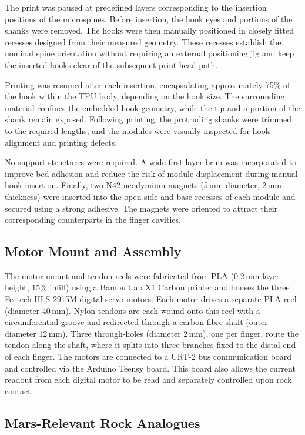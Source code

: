 \documentclass[letterpaper, 10 pt, conference, twoside]{ieeetran}
\begin{document}
The print was paused at predefined layers corresponding to the insertion positions of the microspines. Before insertion, the hook eyes and portions of the shanks were removed. The hooks were then manually positioned in closely fitted recesses designed from their measured geometry. These recesses establish the nominal spine orientation without requiring an external positioning jig and keep the inserted hooks clear of the subsequent print-head path.

Printing was resumed after each insertion, encapsulating approximately 75\% of the hook within the TPU body, depending on the hook size. The surrounding material confines the embedded hook geometry, while the tip and a portion of the shank remain exposed. Following printing, the protruding shanks were trimmed to the required lengths, and the modules were visually inspected for hook alignment and printing defects.

No support structures were required. A wide first-layer brim was incorporated to improve bed adhesion and reduce the risk of module displacement during manual hook insertion. Finally, two N42 neodymium magnets (5\,mm diameter, 2\,mm thickness) were inserted into the open side and base recesses of each module and secured using a strong adhesive. The magnets were oriented to attract their corresponding counterparts in the finger cavities.


\subsection{Motor Mount and Assembly}

The motor mount and tendon reels were fabricated
from PLA (0.2\,mm layer height, 15\% infill) using a Bambu Lab X1 Carbon printer and houses the three Feetech HLS 2915M digital servo motors. Each motor drives a separate PLA reel (diameter 40\,mm). Nylon tendons are each wound onto this reel with a circumferential groove and redirected through a carbon fibre shaft (outer diameter 12\,mm). Three through-holes (diameter 2\,mm), one per finger, route the tendon along the shaft, where it splits into three branches fixed to the distal end of each finger. The motors are connected to a URT-2 bus communication board and controlled via the Arduino Teensy board. This board also allows the current readout from each digital motor to be read and separately controlled upon rock  contact.

\subsection{Mars-Relevant Rock Analogues}
\end{document}
